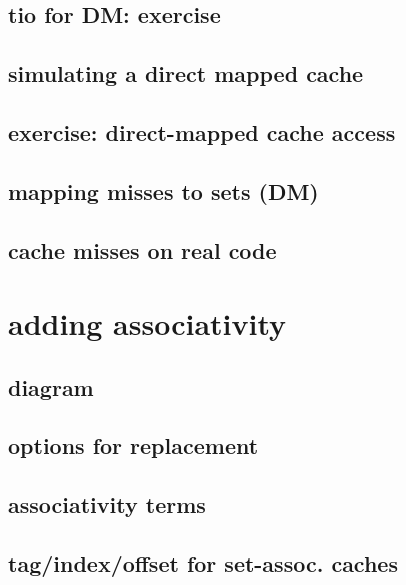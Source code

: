 \subsection{tio for DM: exercise}


\subsection{simulating a direct mapped cache}


\subsection{exercise: direct-mapped cache access}


\subsection{mapping misses to sets (DM)}


\subsection{cache misses on real code}


\section{adding associativity}


\subsection{diagram}


\subsection{options for replacement}


\subsection{associativity terms}


\subsection{tag/index/offset for set-assoc. caches}





